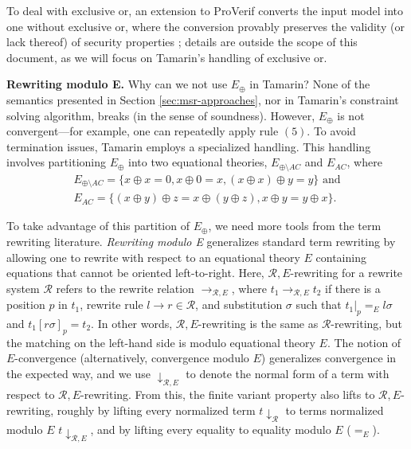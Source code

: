 \documentclass{article}
\theoremstyle{definition}
\begin{document}
To deal with exclusive or, an extension to ProVerif converts the input model into one without exclusive or, 
where the conversion provably preserves the validity (or lack thereof) of security properties \cite{proverif_xor};
details are outside the scope of this document, as we will focus on Tamarin's handling of exclusive or.

\textbf{Rewriting modulo E.} Why can we not use $E_{\oplus}$ in Tamarin? None of the semantics presented in Section \ref{sec:msr-approaches}, 
nor in Tamarin's constraint solving algorithm, breaks (in the sense of soundness). 
However, $E_\oplus$ is not convergent---for example, 
one can repeatedly apply rule $(5)$. To avoid termination issues, 
Tamarin employs a specialized handling. 
This handling involves partitioning $E_\oplus$ into two equational theories, $E_{\oplus \setminus AC}$ and $E_{AC}$, where 
\begin{gather*}
E_{\oplus \setminus AC} = \{ x \oplus x = 0, x \oplus 0 = x, (x \oplus x) \oplus y = y \} \text { and}\\ 
E_{AC} = \{ (x \oplus y) \oplus z = x \oplus (y \oplus z), x \oplus y = y \oplus x \}.
\end{gather*}

To take advantage of this partition of $E_\oplus$, 
we need more tools from the term rewriting literature. 
\emph{Rewriting modulo E} generalizes standard term rewriting by allowing one to rewrite 
with respect to an equational theory $E$ containing equations that cannot be oriented left-to-right.
Here, $\mathcal{R}, E$-rewriting for a rewrite system $\mathcal{R}$ refers to 
the rewrite relation $\rightarrow_{\mathcal{R},E}$,
where $t_1 \rightarrow_{\mathcal{R},E} t_2$ if there is a position $p$ in $t_1$, 
rewrite rule $l \rightarrow r \in \mathcal{R}$, and substitution $\sigma$ such that 
$t_1|_p =_E l\sigma$ and $t_1[r\sigma]_p = t_2$. In other words, $\mathcal{R},E$-rewriting
is the same as $\mathcal{R}$-rewriting, but the matching on the left-hand side is modulo equational theory $E$.
The notion of $E$-convergence (alternatively, convergence modulo $E$) generalizes convergence in the expected way, and
we use $\downarrow_{\mathcal{R},E}$ to denote the normal form of a term with respect to $\mathcal{R},E$-rewriting.
From this, the finite variant property also lifts to $\mathcal{R}, E$-rewriting, 
roughly by lifting every normalized term $t\!\downarrow_{\mathcal{R}}$ to terms normalized modulo $E$
$t\!\downarrow_{\mathcal{R}, E}$, and by lifting every 
equality to equality modulo $E$ ($=_E$).
\end{document}
